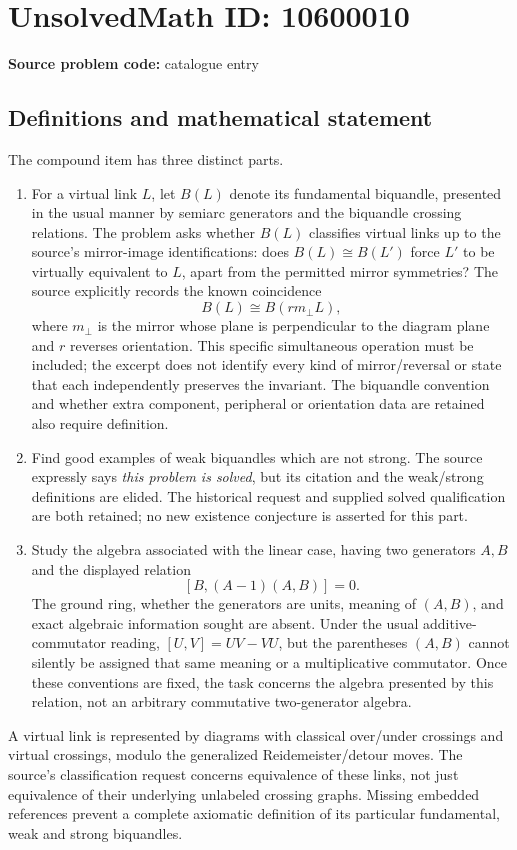 \documentclass[11pt]{article}
\begin{document}
\section*{UnsolvedMath ID: 10600010}
\textbf{Source problem code:} catalogue entry
\subsection{Definitions and mathematical statement}
The compound item has three distinct parts.
\begin{enumerate}
\item For a virtual link \(L\), let \(B(L)\) denote its fundamental biquandle, presented in the usual manner by semiarc generators and the biquandle crossing relations. The problem asks whether \(B(L)\) classifies virtual links up to the source's mirror-image identifications: does \(B(L)\cong B(L')\) force \(L'\) to be virtually equivalent to \(L\), apart from the permitted mirror symmetries? The source explicitly records the known coincidence
\[B(L)\cong B(rm_\perp L),\]
where \(m_\perp\) is the mirror whose plane is perpendicular to the diagram plane and \(r\) reverses orientation. This specific simultaneous operation must be included; the excerpt does not identify every kind of mirror/reversal or state that each independently preserves the invariant. The biquandle convention and whether extra component, peripheral or orientation data are retained also require definition.
\item Find good examples of weak biquandles which are not strong. The source expressly says \emph{this problem is solved}, but its citation and the weak/strong definitions are elided. The historical request and supplied solved qualification are both retained; no new existence conjecture is asserted for this part.
\item Study the algebra associated with the linear case, having two generators \(A,B\) and the displayed relation
\[[B,(A-1)(A,B)]=0.\]
The ground ring, whether the generators are units, meaning of \((A,B)\), and exact algebraic information sought are absent. Under the usual additive-commutator reading, \([U,V]=UV-VU\), but the parentheses \((A,B)\) cannot silently be assigned that same meaning or a multiplicative commutator. Once these conventions are fixed, the task concerns the algebra presented by this relation, not an arbitrary commutative two-generator algebra.
\end{enumerate}
A virtual link is represented by diagrams with classical over/under crossings and virtual crossings, modulo the generalized Reidemeister/detour moves. The source's classification request concerns equivalence of these links, not just equivalence of their underlying unlabeled crossing graphs. Missing embedded references prevent a complete axiomatic definition of its particular fundamental, weak and strong biquandles.
\end{document}
